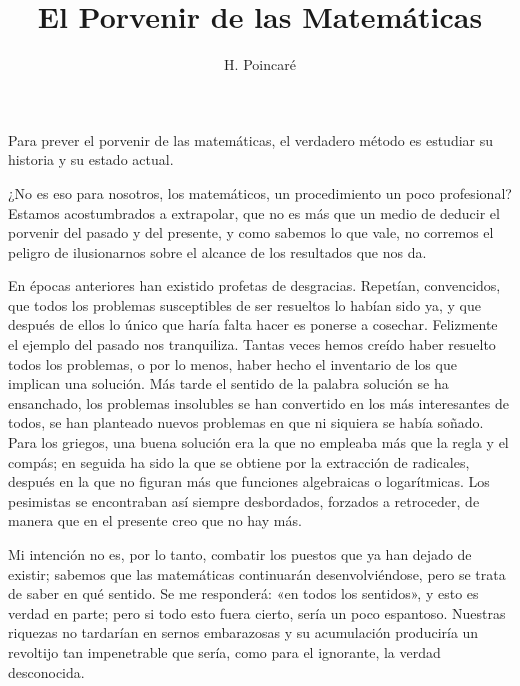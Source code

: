 \documentclass[a4paper, 12pt]{article}
\title{El Porvenir de las Matemáticas}
\author{H. Poincaré}
\date{}
\begin{document}
\begin{tcolorbox}[colback=blue!5!white,colframe=blue!75!black]

\vspace{-1.8cm}
\textbf \maketitle

\end{tcolorbox}

\bigskip

Para prever el porvenir de las matemáticas, el verdadero método es
estudiar su historia y su estado actual.

¿No es eso para nosotros, los matemáticos, un procedimiento un poco
profesional? Estamos acostumbrados a extrapolar, que no es más que un
medio de deducir el porvenir del pasado y del presente, y como sabemos lo
que vale, no corremos el peligro de ilusionarnos sobre el alcance de los
resultados que nos da.

En épocas anteriores han existido profetas de desgracias. Repetían,
convencidos, que todos los problemas susceptibles de ser resueltos lo habían sido ya, y que después de ellos lo único que haría
falta hacer es ponerse a cosechar. Felizmente el ejemplo del pasado nos
tranquiliza. Tantas veces hemos creído haber resuelto todos los
problemas, o por lo menos, haber hecho el inventario de los que implican una
solución. Más tarde el sentido de la palabra solución se ha
ensanchado, los problemas insolubles se han convertido en los más
interesantes de todos, se han planteado nuevos problemas en que ni siquiera
se había soñado. Para los griegos, una buena solución era la
que no empleaba más que la regla y el compás; en seguida ha sido la
que se obtiene por la extracción de radicales, después en la que no
figuran más que funciones algebraicas o logarítmicas. Los
pesimistas se encontraban así siempre desbordados, forzados a
retroceder, de manera que en el presente creo que no hay más.

Mi intención no es, por lo tanto, combatir los puestos que ya han dejado
de existir; sabemos que las matemáticas continuarán desenvolviéndose, pero se trata de saber en qué
sentido. Se me responderá: «en todos los sentidos», y esto es verdad en parte; pero si todo esto fuera
cierto, sería un poco espantoso. Nuestras riquezas no tardarían en
sernos embarazosas y su acumulación produciría un revoltijo tan
impenetrable que sería, como para el ignorante, la verdad desconocida.
\end{document}
